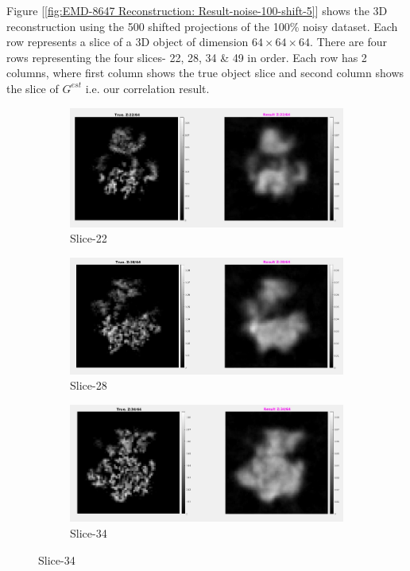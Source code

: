 \documentclass{report}
\begin{document}
Figure [\ref{fig:EMD-8647 Reconstruction: Result-noise-100-shift-5}] shows the 3D reconstruction using the 500 shifted projections of the 100\% noisy dataset. Each row represents a slice of a 3D object of dimension $64\times64\times64$. There are four rows representing the four slices- 22, 28, 34 \& 49 in order. Each row has 2 columns, where first column shows the true object slice and second column shows the slice of $G^{est}$ i.e. our correlation result. 

\begin{figure}[H]
\centering

\begin{subfigure}{1\textwidth}
\centering
\includegraphics[width=1\linewidth]{emd_8647_result_sharp_1.png}
\captionsetup{justification=centering}
\caption{ Slice-22 }
\end{subfigure} 

\begin{subfigure}{1\textwidth}
\centering
\includegraphics[width=1\linewidth]{emd_8647_result_sharp_2.png}
\captionsetup{justification=centering}
\caption{ Slice-28 }
\end{subfigure} 

\begin{subfigure}{1\textwidth}
\centering
\includegraphics[width=1\linewidth]{emd_8647_result_sharp_3.png}
\captionsetup{justification=centering}
\caption{ Slice-34 }
\end{subfigure} 


\end{figure}
\end{document}
